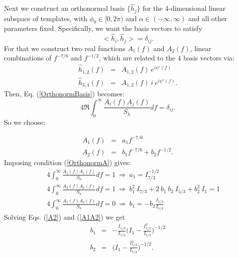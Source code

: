 Next we construct an orthonormal basis $\{ \hat{h}_j \}$ for the 4-dimensional 
linear subspace of templates, with $\phi_0 \in [0,2\pi)$ and 
$\alpha \in (-\infty, \infty)$ and all other parameters fixed.
Specifically, we want the basis vectors to satisfy
\begin{equation}
< \hat{h}_i , \hat{h}_j > = \delta_{ij}.
\label{OrthonormBasis}
\end{equation}
For that we construct two real functions $A_1(f)$ and $A_2(f)$, linear 
combinations of $f^{-7/6}$ and $f^{-1/2}$, which are related to the 4 basis
vectors via:
\begin{eqnarray}
 \hat{h}_{1,2}(f) &=& A_{1,2}(f) \: e^{i \psi'(f)} \\
 \hat{h}_{3,4}(f) &=& A_{1,2}(f) \: i \: e^{i \psi'(f)}.
\end{eqnarray}
Then, Eq. (\ref{OrthonormBasis}) becomes:
\begin{equation}
4 \Re \int_0^{\infty} \frac{A_i(f) A_j(f)}{S_h} df = \delta_{ij}.
\label{OrthonormA}
\end{equation}
So we choose:

\begin{eqnarray}
A_1(f) &=& a_1 f^{-7/6} \\
A_2(f) &=& b_1 f^{-7/6} + b_2 f^{-1/2}.
\end{eqnarray}
Imposing condition (\ref{OrthonormA}) gives:
\begin{eqnarray}
\label{A1}
&& 4 \int_0^{\infty} \frac{A_1(f) A_1(f)}{S_h} df = 1 \: \Rightarrow \:
	a_1 = I_{7/3}^{-1/2} \\ 
\label{A2}
&& 4 \int_0^{\infty} \frac{A_2(f) A_2(f)}{S_h} df = 1 \: \Rightarrow \:
	b_1^2\: I_{7/3} + 2\: b_1\: b_2 \: I_{5/3} + 
	b_2^2 \: I_1 = 1 \\
\label{A1A2}
&& 4 \int_0^{\infty} \frac{A_1(f) A_2(f)}{S_h} df = 0 \: \Rightarrow \:
	b_1 = - b_2 \frac{I_{5/3}}{I_{7/3}} 
\end{eqnarray}
Solving Eqs. (\ref{A2}) and (\ref{A1A2}) we get
\begin{eqnarray}
b_1 &=& - \frac{I_{5/3}}{I_{7/3}} \Big ( I_1 - \frac{I_{5/3}^2}{I_{7/3}}  
	\Big )^{-1/2} \\
b_2 &=& \Big ( I_1 - \frac{I_{5/3}^2}{I_{7/3}} \Big )^{-1/2}.
\end{eqnarray}

